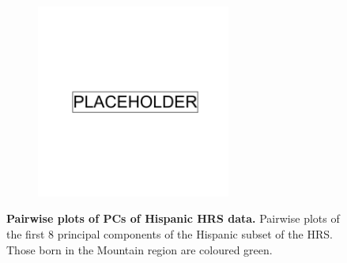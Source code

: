 \begin{figure}
    \centering
    \begin{subfigure}{\textwidth}
    \includegraphics[width=0.7\textwidth]{placeholder.png}
    \end{subfigure}
    \caption[Pairwise plots of PCs of Hispanic HRS data]{\textbf{Pairwise plots of PCs of Hispanic HRS data.} Pairwise plots of the first 8 principal components of the Hispanic subset of the HRS. Those born in the Mountain region are coloured green.}
    \label{fig:supp_hrs_hisp_grid}
\end{figure}

\newpage

